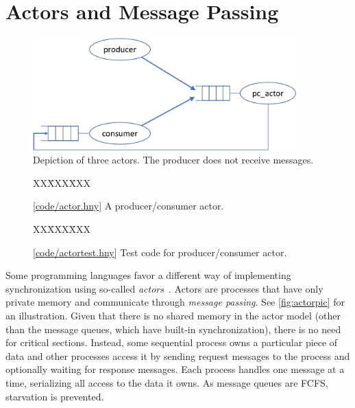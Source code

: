 \documentclass{report}
\newcommand{\harmonysource}[1]{
\begin{tabbing}
XX\=XXX\=XXX\kill
    
\end{tabbing}
}
\newcommand{\harmonylink}[1]{%
[\href{https://www.cs.cornell.edu/home/rvr/harmony/#1}{\underline{#1}}]%
}
\newenvironment{code}{
\tcolorbox
}{
\endtcolorbox
}
\begin{document}
\chapter{Actors and Message Passing}
\label{ch:actor}
%
%

%

\begin{figure}
\begin{center}
\includegraphics[width=4in]{figures/actor-crop.pdf}
\end{center}
\caption{Depiction of three actors.  The producer does not receive messages.}
\label{fig:actorpic}
\end{figure}

\begin{figure}
\begin{code}
\harmonysource{actor}
\end{code}
\caption{\harmonylink{code/actor.hny} A producer/consumer actor.}
\label{fig:actor}
\end{figure}

\begin{figure}
\begin{code}
\harmonysource{actortest}
\end{code}
\caption{\harmonylink{code/actortest.hny} Test code for producer/consumer actor.}
\label{fig:actortest}
\end{figure}

Some programming languages favor a different way of implementing
synchronization using so-called \emph{actors}~\cite{HBS73}.  Actors are
processes that have only private memory and communicate through
\emph{message passing}.
See \autoref{fig:actorpic} for an illustration.
Given that there is no shared memory in the actor model (other than the message
queues, which have built-in synchronization), there is no need
for critical sections.  Instead, some sequential process owns a particular
piece of data and other processes access it by sending request messages
to the process and optionally waiting for response messages.  Each process
handles one message at a time, serializing all access to the data it owns.
As message queues are FCFS, starvation is prevented.
\end{document}
